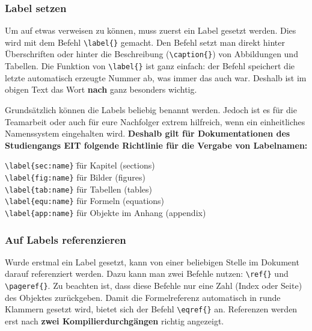 \subsubsection{Label setzen}
Um auf etwas verweisen zu können, muss zuerst ein Label gesetzt werden. Dies wird mit dem Befehl \verb|\label{}| gemacht. Den Befehl setzt man direkt hinter Überschriften oder hinter die Beschreibung (\verb|\caption{}|) von Abbildungen und Tabellen.  Die Funktion von \verb|\label{}| ist ganz einfach: der Befehl speichert die letzte automatisch erzeugte Nummer ab, was immer das auch war. Deshalb ist im obigen Text das Wort \textbf{nach} ganz besonders wichtig.

Grundsätzlich können die Labels beliebig benannt werden. Jedoch ist es für die Teamarbeit oder auch für eure Nachfolger extrem hilfreich, wenn ein einheitliches Namenssystem eingehalten wird. \textbf{Deshalb gilt für Dokumentationen des Studiengangs EIT folgende Richtlinie für die Vergabe von Labelnamen:}
\begin{tabbing}
\quad \= \verb|\label{sec:name}|  \qquad \= für Kapitel (sections)\\
      \> \verb|\label{fig:name}|  \> für Bilder (figures)\\
      \> \verb|\label{tab:name}|  \> für Tabellen (tables)\\
      \> \verb|\label{equ:name}|  \> für Formeln (equations)\\
      \> \verb|\label{app:name}|  \> für Objekte im Anhang (appendix)
\end{tabbing}

\subsubsection{Auf Labels referenzieren}
Wurde erstmal ein Label gesetzt, kann von einer beliebigen Stelle im Dokument darauf referenziert werden. Dazu kann man zwei Befehle nutzen: \verb|\ref{}| und \verb|\pageref{}|. Zu beachten ist, dass diese Befehle nur eine Zahl (Index oder Seite) des Objektes zurückgeben. Damit die Formelreferenz automatisch in runde Klammern gesetzt wird, bietet sich der Befehl \verb|\eqref{}| an. Referenzen werden erst nach \textbf{zwei Kompilierdurchgängen} richtig angezeigt.

